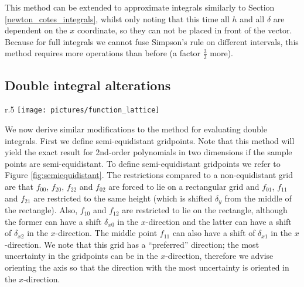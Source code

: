 This method can be extended to approximate integrals similarly to Section \ref{newton_cotes_integrals}, whilst only noting that this time all $h$ and all $\delta$ are dependent on the $x$ coordinate, so they can not be placed in front of the vector.
Because for full integrals we cannot fuse Simpson's rule on different intervals, this method requires more operations than before (a factor $\frac{3}{2}$ more).


\subsection{Double integral alterations}
\label{doub_alter}
\begin{wrapfigure}{r}{.5\textwidth}
    \vspace{-1em}
    \texttt{[image: pictures/function\_lattice]}
    \vspace{-1.5em}
    \caption{A semi-equidistant grid, we note that in this case $\delta_{y0}$ and $\delta_{x1}$ are both negative.}
    \label{fig:semiequidistant}
    \vspace{-1em}
\end{wrapfigure}
We now derive similar modifications to the method for evaluating double integrals.
First we define semi-equidistant gridpoints.
Note that this method will yield the exact result for 2nd-order polynomials in two dimensions if the sample points are semi-equidistant.
To define semi-equidistant gridpoints we refer to Figure \ref{fig:semiequidistant}.
The restrictions compared to a non-equidistant grid are that $f_{00}$, $f_{20}$, $f_{22}$ and $f_{02}$ are forced to lie on a rectangular grid and $f_{01}$, $f_{11}$ and $f_{21}$ are restricted to the same height (which is shifted $\delta_y$ from the middle of the rectangle).
Also, $f_{10}$ and $f_{12}$ are restricted to lie on the rectangle, although the former can have a shift $\delta_{x0}$ in the $x$-direction and the latter can have a shift of $\delta_{x2}$ in the $x$-direction.
The middle point $f_{11}$ can also have a shift of $\delta_{x1}$ in the $x$-direction.
We note that this grid has a ``preferred'' direction; the most uncertainty in the gridpoints can be in the $x$-direction, therefore we advise orienting the axis so that the direction with the most uncertainty is oriented in the $x$-direction.

